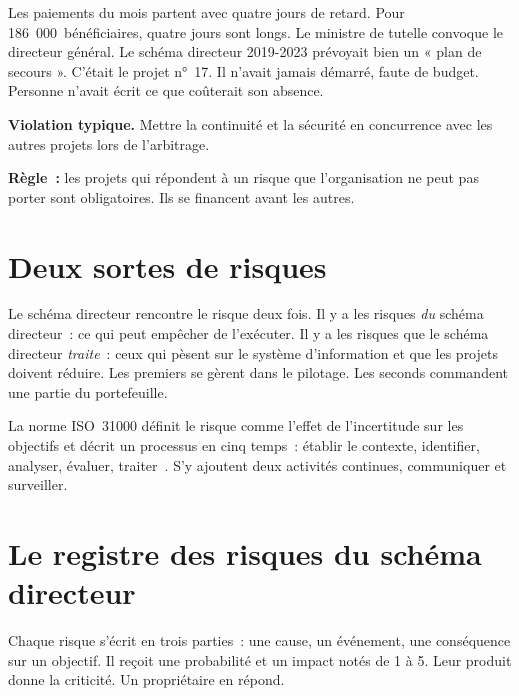 Les paiements du mois partent avec quatre jours de retard. Pour 186~000~bénéficiaires, quatre jours sont longs.
Le ministre de tutelle convoque le directeur général. Le schéma directeur 2019-2023 prévoyait bien un « plan de
secours ». C'était le projet n°~17. Il n'avait jamais démarré, faute de budget. Personne n'avait écrit ce que
coûterait son absence.

\begin{boxalert}
\textbf{Violation typique.} Mettre la continuité et la sécurité en concurrence avec les autres projets lors de
l'arbitrage.

\smallskip
\textbf{Règle~:} les projets qui répondent à un risque que l'organisation ne peut pas porter sont
obligatoires. Ils se financent avant les autres.
\end{boxalert}

\section{Deux sortes de risques}
\label{sec:c14-deux}

Le schéma directeur rencontre le risque deux fois. Il y a les risques \emph{du} schéma directeur~: ce qui peut
empêcher de l'exécuter. Il y a les risques que le schéma directeur \emph{traite}~: ceux qui pèsent sur le
système d'information et que les projets doivent réduire. Les premiers se gèrent dans le pilotage. Les seconds
commandent une partie du portefeuille.

La norme ISO~31000 définit le risque comme l'effet de l'incertitude sur les objectifs et décrit un processus en
cinq temps~: établir le contexte, identifier, analyser, évaluer, traiter~\cite{iso31000}. S'y ajoutent deux
activités continues, communiquer et surveiller.

\section{Le registre des risques du schéma directeur}
\label{sec:c14-registre}

Chaque risque s'écrit en trois parties~: une cause, un événement, une conséquence sur un objectif. Il reçoit
une probabilité et un impact notés de 1 à 5. Leur produit donne la criticité. Un propriétaire en répond.

